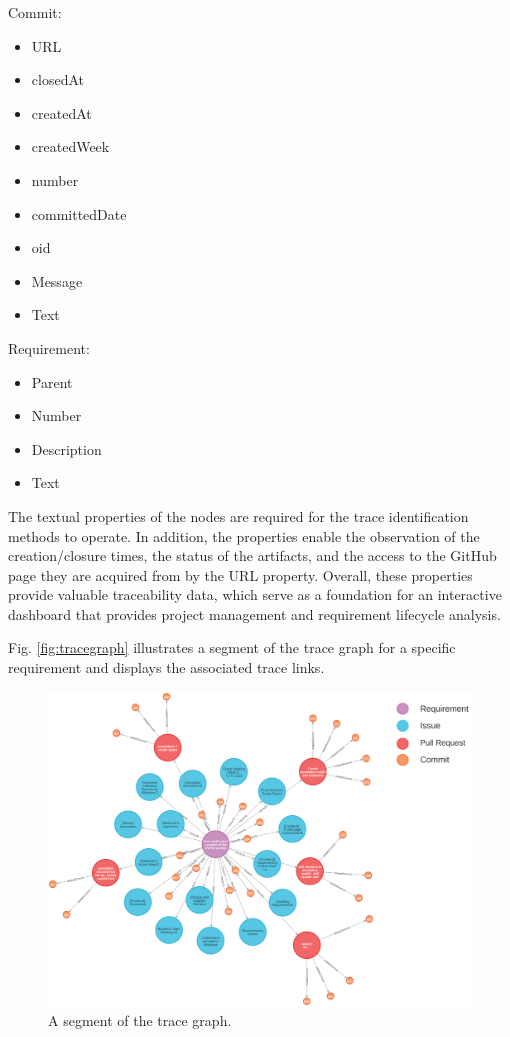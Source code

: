 \documentclass[conference]{IEEEtran}
\begin{document}
\begin{multicols}{2}    

Commit:
\begin{itemize}
\item URL
\item closedAt
\item createdAt
\item createdWeek
\item number
\item committedDate
\item oid
\item Message
\item Text
\end{itemize}

\columnbreak

Requirement:
\begin{itemize}
\item Parent
\item Number
\item Description
\item Text
\end{itemize}



\end{multicols}

The textual properties of the nodes are required for the trace identification methods to operate. In addition, the properties enable the observation of the creation/closure times, the status of the artifacts, and the access to the GitHub page they are acquired from by the URL property. Overall, these properties provide valuable traceability data, which serve as a foundation for an interactive dashboard that provides project management and requirement lifecycle analysis.

Fig. \ref{fig:tracegraph} illustrates a segment of the trace graph for a specific requirement and displays the associated trace links.

\begin{figure}[htb]
    \centering
    \includegraphics[width=0.75\linewidth]{figs/rawTraceGraph.png}
    \caption{A segment of the trace graph.}
    \label{fig:rawtracegraph}
\end{figure}
\end{document}
